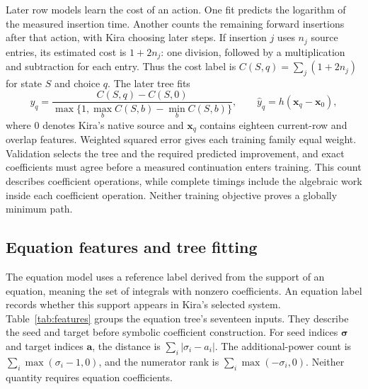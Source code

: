 Later row models learn the cost of an action. One fit predicts the logarithm of the measured insertion time. Another counts the remaining forward insertions after that action, with Kira choosing later steps. If insertion $j$ uses $n_j$ source entries, its estimated cost is $1+2n_j$: one division, followed by a multiplication and subtraction for each entry. Thus the cost label is $C(S,q)=\sum_j(1+2n_j)$ for state $S$ and choice $q$. The later tree fits
\begin{equation}
 y_q=\frac{C(S,q)-C(S,0)}{\max\{1,\max_b C(S,b)-\min_b C(S,b)\}},
 \qquad \widehat y_q=h(\boldsymbol x_q-\boldsymbol x_0),
\end{equation}
where $0$ denotes Kira's native source and $\boldsymbol x_q$ contains eighteen current-row and overlap features. Weighted squared error gives each training family equal weight. Validation selects the tree and the required predicted improvement, and exact coefficients must agree before a measured continuation enters training. This count describes coefficient operations, while complete timings include the algebraic work inside each coefficient operation. Neither training objective proves a globally minimum path.

\subsection{Equation features and tree fitting}
The equation model uses a reference label derived from the support of an equation, meaning the set of integrals with nonzero coefficients. An equation label records whether this support appears in Kira's selected system. Table~\ref{tab:features} groups the equation tree's seventeen inputs. They describe the seed and target before symbolic coefficient construction. For seed indices $\boldsymbol\sigma$ and target indices $\boldsymbol a$, the distance is $\sum_i|\sigma_i-a_i|$. The additional-power count is $\sum_i\max(\sigma_i-1,0)$, and the numerator rank is $\sum_i\max(-\sigma_i,0)$. Neither quantity requires equation coefficients.

